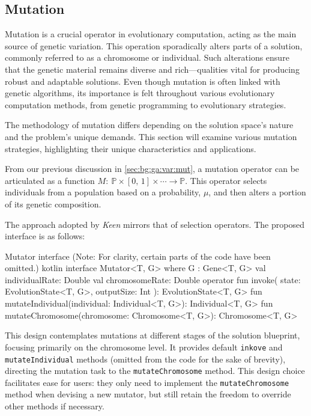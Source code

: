 \subsection{Mutation}
\label{sec:keen:op:mut}
  Mutation is a crucial operator in evolutionary computation, acting as the main source of genetic variation.
  This operation sporadically alters parts of a solution, commonly referred to as a chromosome or individual. Such 
  alterations ensure that the genetic material remains diverse and rich—qualities vital for producing robust and 
  adaptable solutions. Even though mutation is often linked with genetic algorithms, its importance is felt throughout 
  various evolutionary computation methods, from genetic programming to evolutionary strategies.

  The methodology of mutation differs depending on the solution space's nature and the problem's unique demands. This 
  section will examine various mutation strategies, highlighting their unique characteristics and applications.

  From our previous discussion in \vref{sec:bg:ga:var:mut}, a mutation operator can be articulated as a function 
  \(M :\: \mathbb{P} \times [0,\, 1] \times \cdots \to \mathbb{P}\). This operator selects individuals from a 
  population based on a probability, \(\mu\), and then alters a portion of its genetic composition.

  The approach adopted by \textit{Keen} mirrors that of selection operators. The proposed interface is as follows:

  \begin{code}{
    Mutator interface (Note: For clarity, certain parts of the code have been omitted.)
  }{}{kotlin}
    interface Mutator<T, G> where G : Gene<T, G> {
        val individualRate: Double
        val chromosomeRate: Double
        operator fun invoke(
            state: EvolutionState<T, G>, outputSize: Int
        ): EvolutionState<T, G>
        fun mutateIndividual(individual: Individual<T, G>): Individual<T, G>
        fun mutateChromosome(chromosome: Chromosome<T, G>): Chromosome<T, G>
    }
  \end{code}

  This design contemplates mutations at different stages of the solution blueprint, focusing primarily on the 
  chromosome level. It provides default \texttt{inkove} and \texttt{mutateIndividual} methods (omitted from the code 
  for the sake of brevity), directing the mutation task to the \texttt{mutateChromosome} method. This design choice 
  facilitates ease for users: they only need to implement the \texttt{mutateChromosome} method when devising a new 
  mutator, but still retain the freedom to override other methods if necessary.

